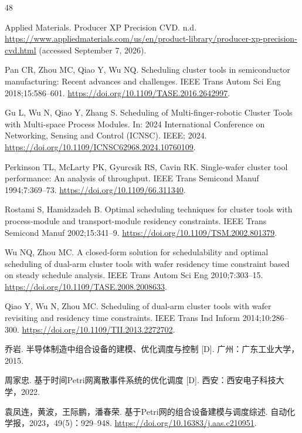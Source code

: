 \cleardoublepage{}
\begin{thebibliography}{48}

Applied Materials. Producer XP Precision CVD.
n.d.
\url{https://www.appliedmaterials.com/us/en/product-library/producer-xp-precision-cvd.html} (accessed September 7, 2026).

Pan CR, Zhou MC, Qiao Y, Wu NQ. Scheduling cluster tools in semiconductor manufacturing: Recent advances and challenges.
IEEE Trans Autom Sci Eng 2018;15:586--601.
\url{https://doi.org/10.1109/TASE.2016.2642997}.

Gu L, Wu N, Qiao Y, Zhang S. Scheduling of {Multi-finger-robotic Cluster Tools} with {Multi-space Process Modules}.
In: 2024 International Conference on Networking, Sensing and Control ({ICNSC}). IEEE; 2024.
\url{https://doi.org/10.1109/ICNSC62968.2024.10760109}.

Perkinson TL, McLarty PK, Gyurcsik RS, Cavin RK. Single-wafer cluster tool performance: An analysis of throughput.
IEEE Trans Semicond Manuf 1994;7:369--73.
\url{https://doi.org/10.1109/66.311340}.

Rostami S, Hamidzadeh B. Optimal scheduling techniques for cluster tools with process-module and transport-module residency constraints.
IEEE Trans Semicond Manuf 2002;15:341--9.
\url{https://doi.org/10.1109/TSM.2002.801379}.

Wu NQ, Zhou MC. A closed-form solution for schedulability and optimal scheduling of dual-arm cluster tools with wafer residency time constraint based on steady schedule analysis.
IEEE Trans Autom Sci Eng 2010;7:303--15.
\url{https://doi.org/10.1109/TASE.2008.2008633}.

Qiao Y, Wu N, Zhou MC. Scheduling of dual-arm cluster tools with wafer revisiting and residency time constraints.
IEEE Trans Ind Inform 2014;10:286--300.
\url{https://doi.org/10.1109/TII.2013.2272702}.

乔岩. 半导体制造中组合设备的建模、优化调度与控制 [D]. 广州：广东工业大学，2015.

周家忠. 基于时间Petri网离散事件系统的优化调度 [D]. 西安：西安电子科技大学，2022.

袁凤连，黄波，王际鹏，潘春荣. 基于Petri网的组合设备建模与调度综述. 自动化学报，2023，49(5)：929--948.
\url{https://doi.org/10.16383/j.aas.c210951}.


\end{thebibliography}
